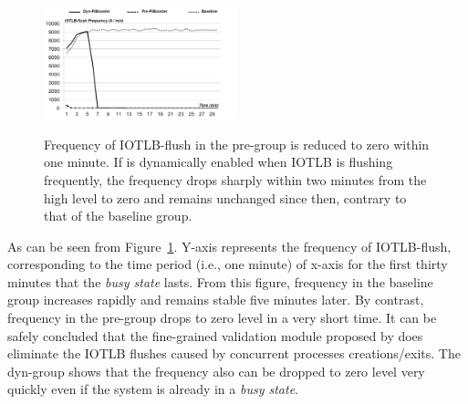 \begin{figure}[ht]
\centering
\includegraphics[width=0.5\textwidth]{image/micro/iotlbflush.jpg} \\
\caption{Frequency of IOTLB-flush in the pre-\name group is reduced to zero within one minute. If \name is dynamically enabled when IOTLB is flushing frequently, the frequency drops sharply within two minutes from the high level to zero and remains unchanged since then, contrary to that of the baseline group.}
\label{fig:iotlbflush}
\end{figure}

As can be seen from Figure~\ref{fig:iotlbflush}. Y-axis represents the frequency of IOTLB-flush, corresponding to the time period (i.e., one minute) of x-axis for the first thirty minutes that the \emph{busy state} lasts. From this figure, frequency in the baseline group increases rapidly and remains stable five minutes later. By contrast, frequency in the pre-\name group drops to zero level in a very short time. It can be safely concluded that the fine-grained validation module proposed by \name does eliminate the IOTLB flushes caused by concurrent processes creations/exits. The dyn-\name group shows that the frequency also can be dropped to zero level very quickly even if the system is already in a \emph{busy state}.

